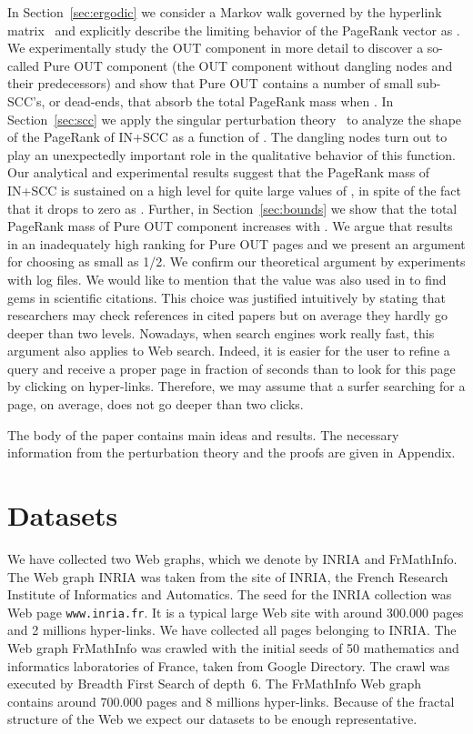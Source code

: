 \documentclass{article}
\begin{document}
In
Section~\ref{sec:ergodic} we consider a Markov walk governed by the
hyperlink matrix~ and explicitly describe the limiting behavior
of the PageRank vector as . We experimentally study the
OUT component in more detail to discover a so-called Pure OUT
component (the OUT component without dangling nodes and their
predecessors) and show that Pure OUT contains a number of small
sub-SCC's, or dead-ends, that absorb the total PageRank mass when
. In Section~\ref{sec:scc} we apply the singular perturbation
theory~\cite{Avrachenkov99thesis,KorolyukTurbin,PervozvanskiiGaitsgori,YinZhang}
to analyze the shape of the PageRank of IN+SCC as a function of
. The dangling nodes turn out to play an unexpectedly important
role in the qualitative behavior of this function. Our analytical
and experimental results suggest that the PageRank mass of IN+SCC
is sustained on a high level for quite large values of
, in spite of the fact that it drops to zero as .
 Further, in Section~\ref{sec:bounds} we show that the total
PageRank mass of Pure OUT component increases with . We argue
that  results in an inadequately high ranking for Pure OUT
pages and we present an argument for choosing  as small as 1/2.
We confirm our theoretical argument by experiments with log files.
We would like to mention that the value  was also used in
\cite{PRcitations} to find gems in scientific citations. This choice
was justified intuitively by stating that researchers may check
references in cited papers but on average they hardly go deeper than
two levels. Nowadays, when search engines work really fast, this
argument also applies to Web search. Indeed, it is easier for the
user to refine a query and receive a proper page in fraction of
seconds than to look for this page by clicking on hyper-links.
Therefore, we may assume that a surfer searching for a page, on
average, does not go deeper than two clicks.

The body of the paper contains main ideas and results. The
necessary information from the perturbation theory and the proofs
are given in Appendix.


\section{Datasets}
\label{sec:datasets}

We have collected two Web graphs, which we denote by INRIA and
FrMathInfo. The Web graph INRIA was taken from the site of INRIA,
the French Research Institute of Informatics and Automatics. The
seed for the INRIA collection was Web page {\tt www.inria.fr}. It is
a typical large Web site with around 300.000 pages and 2 millions
hyper-links. We have collected all pages belonging to INRIA. The Web
graph FrMathInfo was crawled with the initial seeds of 50
mathematics and informatics laboratories of France, taken from
Google Directory. The crawl was executed by Breadth First Search of
depth~6. The FrMathInfo Web graph contains around 700.000 pages and
8 millions hyper-links. Because of the fractal structure of the Web
\cite{Dill02} we expect our datasets to be enough representative.
\end{document}
